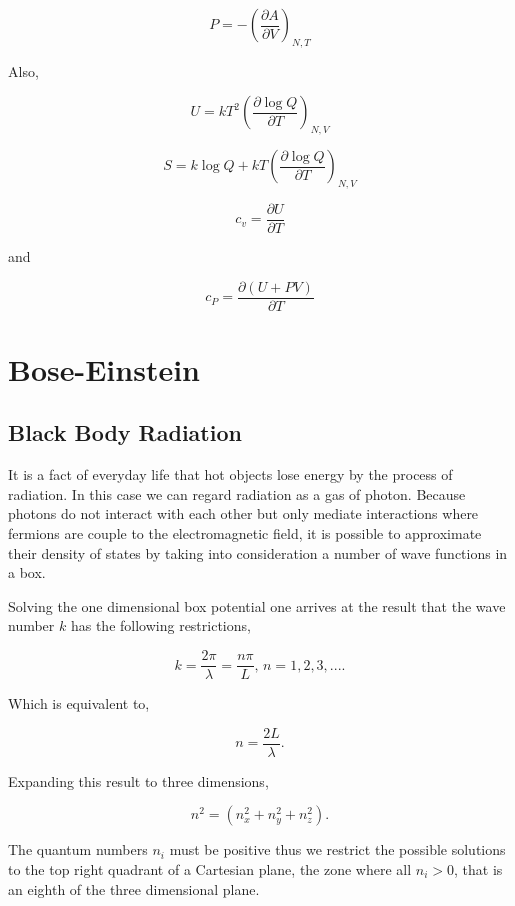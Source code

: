 \documentclass[10pt,twoside,openright]{memoir}
\begin{document}
$$ P = - \left( \frac{\partial A}{\partial V} \right)_{N,T} 
$$

Also,

$$
U = kT^2 \left( \frac{\partial \log Q}{\partial T}\right)_{N,V}
$$

$$
S = k \log Q + kT \left( \frac{\partial \log Q}{\partial T}\right)_{N,V}
$$

$$ c_v = \frac{\partial U}{\partial T}
$$

and 

$$
c_P = \frac{\partial \left( U + PV \right)}{\partial T}
$$

\chapter{Bose-Einstein}
\section{\label{sec:level2} Black Body Radiation}

It is a fact of everyday life that hot objects lose energy by the process of radiation. In this case we can regard radiation as a gas of photon. Because photons do not interact with each other but only mediate interactions where fermions are couple to the electromagnetic field, it is possible to approximate their density of states by taking into consideration a number of wave functions in a box.

Solving the one dimensional box potential one arrives at the result that the wave number $k$ has the following restrictions,

\begin{equation}
k = \frac{2 \pi}{\lambda} = \frac{n \pi}{L}, \,  n=1,2,3,... .
\end{equation}

Which is equivalent to,

\begin{equation}
n = \frac{2 L}{\lambda}.
\end{equation}

Expanding this result to three dimensions,

\begin{equation}
n^2 = \left( n^{2}_{x} + n^{2}_{y} + n^{2}_{z} \right).
\end{equation}

The quantum numbers $n_{i}$ must be positive thus we restrict the possible solutions to the top right quadrant of a Cartesian plane, the zone where all $n_{i} > 0$, that is an eighth of the three dimensional plane. 
\end{document}
